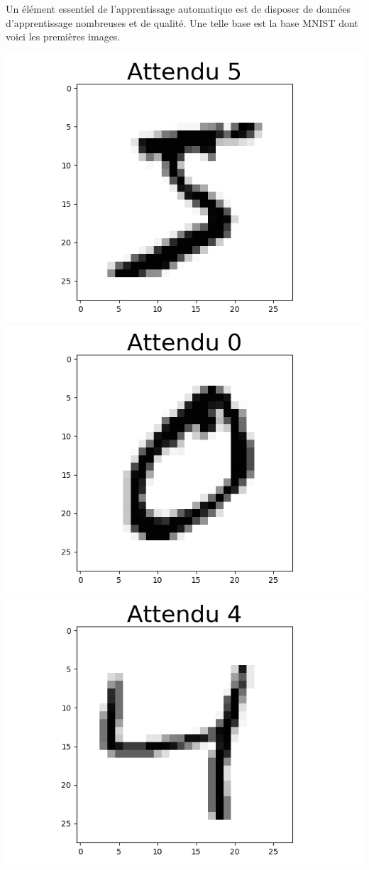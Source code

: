 \documentclass[11pt,class=report,crop=false]{standalone}
\begin{document}

Un élément essentiel de l'apprentissage automatique est de disposer de données d'apprentissage nombreuses et de qualité.
Une telle base est la base MNIST dont voici les premières images.
\begin{center}
\includegraphics[scale=\myscale,scale=0.20]{figures/tf2-chiffre-train-0}
\includegraphics[scale=\myscale,scale=0.20]{figures/tf2-chiffre-train-1}
\includegraphics[scale=\myscale,scale=0.20]{figures/tf2-chiffre-train-2}

\end{center}
\end{document}
